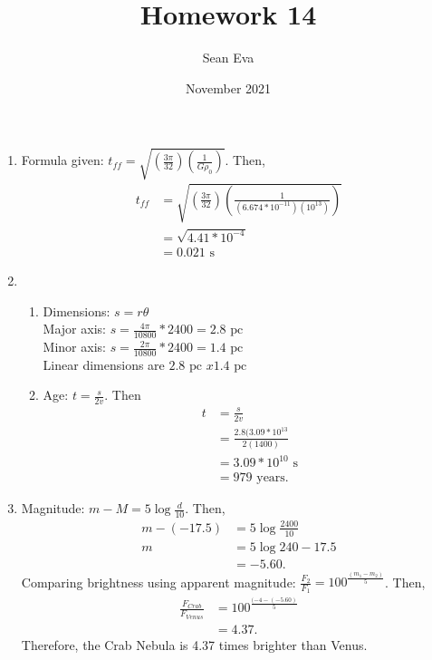 \documentclass{article}
\title{Homework 14}
\author{Sean Eva}
\date{November 2021}
\begin{document}
\maketitle

\begin{enumerate}
    \item 
    
    Formula given: $t_{ff} = \sqrt{(\frac{3\pi}{32})(\frac{1}{G\rho_0})}$. Then,
    \begin{align*}
        t_{ff} &= \sqrt{(\frac{3\pi}{32})(\frac{1}{(6.674*10^{-11})(10^{13})})}\\
        &= \sqrt{4.41*10^{-4}}\\
        &= 0.021\text{ s}
    \end{align*}
    
    \item
    
    \begin{enumerate}
        \item 
        
        Dimensions: $s=r\theta$\\
        Major axis: $s=\frac{4\pi}{10800}*2400 = 2.8\text{ pc}$\\
        Minor axis: $s=\frac{2\pi}{10800}*2400 = 1.4\text{ pc}$\\
        Linear dimensions are $2.8\text{ pc }x1.4\text{ pc}$
        
        \item
        
        Age: $t=\frac{s}{2v}$. Then
        \begin{align*}
            t &= \frac{s}{2v}\\
            &= \frac{2.8(3.09*10^{13}}{2(1400)}\\
            &= 3.09*10^{10}\text{ s}\\
            &= 979\text{ years}.
        \end{align*}
        
    \end{enumerate}
    
    \item
    
    Magnitude: $m-M = 5\log{\frac{d}{10}}$. Then, 
    \begin{align*}
        m - (-17.5) &= 5\log{\frac{2400}{10}}\\
        m &= 5\log{240} - 17.5\\
        &= -5.60.
    \end{align*}
    Comparing brightness using apparent magnitude: $\frac{F_2}{F_1} = 100^{\frac{(m_1-m_2)}{5}}$. Then,
    \begin{align*}
        \frac{F_{Crab}}{F_{Venus}} &= 100^{\frac{(-4-(-5.60)}{5}}\\
        &= 4.37.
    \end{align*} Therefore, the Crab Nebula is 4.37 times brighter than Venus.
    

\end{enumerate}
\end{document}
